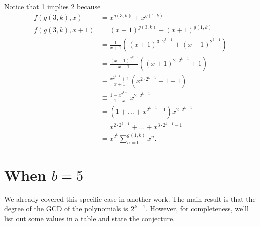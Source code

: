 \documentclass{article}
\begin{document}
	Notice that 1 implies 2 because
	\begin{align*}
		f(g(3,k),x) &= x^{g(3,k)} + x^{g(1,k)} \\
		f(g(3,k),x+1) &= (x+1)^{g(3,k)} + (x+1)^{g(1,k)} \\
		&= \frac{1}{x+1}\left((x+1)^{3\cdot2^{k-1}} + (x+1)^{2^{k-1}}\right) \\
		&= \frac{(x+1)^{2^{k-1}}}{x+1}\left((x+1)^{2\cdot2^{k-1}}+1\right) \\
		&\equiv \frac{x^{2^{k-1}}+1}{x+1}\left(x^{2\cdot2^{k-1}}+1+1\right) \\
		&\equiv \frac{1-x^{2^{k-1}}}{1-x}x^{2\cdot2^{k-1}} \\
		&= \left(1+\dots+x^{2^{k-1}-1}\right)x^{2\cdot2^{k-1}} \\
		&= x^{2\cdot2^{k-1}} + \dots + x^{3\cdot2^{k-1}-1} \\
		&= x^{2^k}\sum_{n=0}^{g(1,k)}{x^n}.
	\end{align*}

	\newpage
	\section{When $b = 5$}
	We already covered this specific case in another work.
	The main result is that the degree of the GCD of the polynomials is $2^{k+1}$.
	However, for completeness, we'll list out some values in a table and state the conjecture.
	
\end{document}
